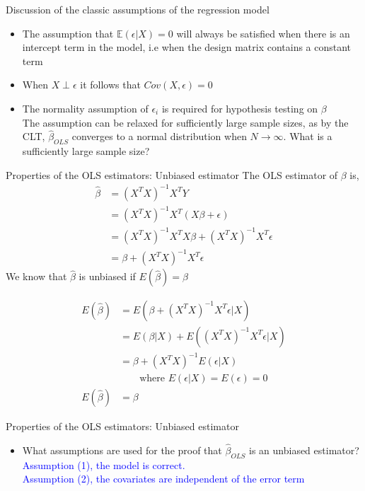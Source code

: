 \documentclass[handout]{beamer}
\begin{document}
\begin{frame}{Discussion of the classic assumptions of the regression model}
\begin{itemize}
\item The assumption that $\mathbb{E}(\epsilon|X)=0$ will always be satisfied when there is an intercept term in the model, i.e when the design matrix contains a constant term \pause
\item When $X\perp \epsilon$ it follows that $Cov(X,\epsilon)=0$ \pause
\item  The normality assumption of $\epsilon_i$ is required for hypothesis testing on $\beta$ \pause \\
The assumption can be relaxed for sufficiently large sample sizes, as by the CLT, $\hat{\beta}_{OLS}$ converges to a normal distribution when 
$N\rightarrow \infty$. What is a sufficiently large sample size? 
\end{itemize}
\end{frame}

\begin{frame}{Properties of the OLS estimators: Unbiased estimator}
The OLS estimator of $\beta$ is,
	\begin{align*}
	 \hat{\beta} &= (X^{T}X)^{-1}X^{T}Y\\
				 &= (X^{T}X)^{-1}X^{T}(X\beta + \epsilon) \\
				 &= (X^{T}X)^{-1}X^{T}X\beta + (X^{T}X)^{-1}X^{T}\epsilon \\
				 &= \beta + (X^{T}X)^{-1}X^{T}\epsilon 
	\end{align*}
	We know that $\hat{\beta}$ is unbiased if $E (\hat{\beta}) = \beta$

	\[ \begin{array}{rl}
	E (\hat{\beta}) &= E(\beta + (X^{T}X)^{-1}X^{T}\epsilon | X) \\
	 &= E(\beta | X) + E((X^{T}X)^{-1}X^{T}\epsilon | X) \\
	 &= \beta + (X^{T}X)^{-1} E(\epsilon | X) \\
	 &\qquad \text{where } E(\epsilon | X) = E(\epsilon) = 0 \\
	E (\hat{\beta}) &= \beta 
	\end{array} \]
\end{frame}

\begin{frame}{Properties of the OLS estimators: Unbiased estimator}
\begin{itemize}
\item What assumptions are used for the proof that $\hat{\beta}_{OLS}$ is an unbiased estimator?\\  \pause
\textcolor{blue}{Assumption (1), the model is correct. \\
Assumption (2), the covariates are independent of the error term}
\end{itemize}
\end{frame}
\end{document}
